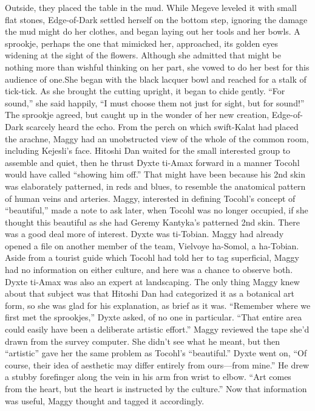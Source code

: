 \documentclass[9pt]{article}
\begin{document}
Outside, they placed the table in the mud. While Megeve leveled it with small flat stones,
Edge-of-Dark settled herself on the bottom step, ignoring the damage the mud might do her clothes, and
began laying out her tools and her bowls.
A sprookje, perhaps the one that mimicked her, approached, its golden eyes widening at the sight of
the flowers. Although she admitted that might be nothing more than wishful thinking on her part, she
vowed to do her best for this audience of one.She began with the black lacquer bowl and reached for a stalk of tick-tick. As she brought the
cutting upright, it began to chide gently. “For sound,” she said happily, “I must choose them not just for
sight, but for sound!” The sprookje agreed, but caught up in the wonder of her new creation,
Edge-of-Dark scarcely heard the echo.
From the perch on which swift-Kalat had placed the arachne, Maggy had an unobstructed view of
the whole of the common room, including Kejesli’s face.
Hitoshi Dan waited for the small interested group to assemble and quiet, then he thrust Dyxte
ti-Amax forward in a manner Tocohl would have called “showing him off.” That might have been because
his 2nd skin was elaborately patterned, in reds and blues, to resemble the anatomical pattern of human
veins and arteries. Maggy, interested in defining Tocohl’s concept of “beautiful,” made a note to ask
later, when Tocohl was no longer occupied, if she thought this beautiful as she had Geremy Kantyka’s
patterned 2nd skin.
There was a good deal more of interest. Dyxte was ti-Tobian. Maggy had already opened a file on
another member of the team, Vielvoye ha-Somol, a ha-Tobian. Aside from a tourist guide which Tocohl
had told her to tag superficial, Maggy had no information on either culture, and here was a chance to
observe both.
Dyxte ti-Amax was also an expert at landscaping. The only thing Maggy knew about that subject
was that Hitoshi Dan had categorized it as a botanical art form, so she was glad for his explanation, as
brief as it was.
“Remember where we first met the sprookjes,” Dyxte asked, of no one in particular. “That entire
area could easily have been a deliberate artistic effort.” Maggy reviewed the tape she’d drawn from the
survey computer. She didn’t see what he meant, but then “artistic” gave her the same problem as
Tocohl’s “beautiful.”
Dyxte went on, “Of course, their idea of aesthetic may differ entirely from ours—from mine.” He
drew a stubby forefinger along the vein in his arm fron wrist to elbow. “Art comes from the heart, but the
heart is instructed by the culture.”
Now that information was useful, Maggy thought and tagged it accordingly.
\end{document}
